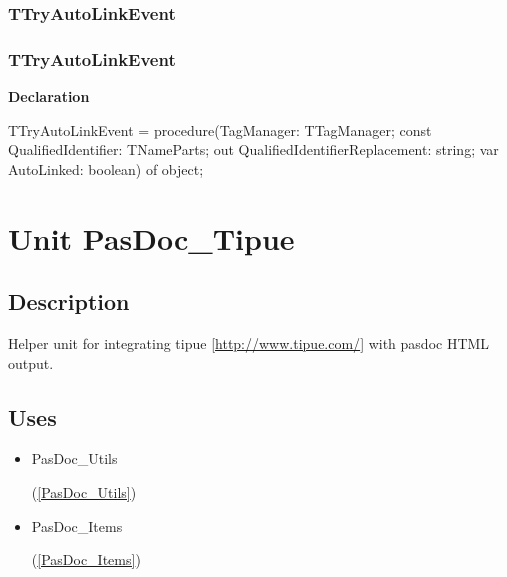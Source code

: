 \documentclass{report}
\newif\ifpdf
\begin{document}
\subsection*{\large{\textbf{TTryAutoLinkEvent}}\normalsize\hspace{1ex}\hrulefill}
\else
\subsection*{TTryAutoLinkEvent}
\fi
\label{PasDoc_TagManager-TTryAutoLinkEvent}
\begin{list}{}{
\setlength{\itemindent}{0cm}
\setlength{\listparindent}{0cm}
\setlength{\leftmargin}{\evensidemargin}
\addtolength{\leftmargin}{\tmplength}
\settowidth{\labelsep}{X}
\addtolength{\leftmargin}{\labelsep}
\setlength{\labelwidth}{\tmplength}
}
\item[\textbf{Declaration}\hfill]
\ifpdf
\begin{flushleft}
\fi
\begin{ttfamily}
TTryAutoLinkEvent = procedure(TagManager: TTagManager; const QualifiedIdentifier: TNameParts; out QualifiedIdentifierReplacement: string; var AutoLinked: boolean) of object;\end{ttfamily}

\ifpdf
\end{flushleft}
\fi

\end{list}
\chapter{Unit PasDoc{\_}Tipue}
\label{PasDoc_Tipue}
\section{Description}
Helper unit for integrating tipue [\href{http://www.tipue.com/}{http://www.tipue.com/}] with pasdoc HTML output.
\section{Uses}
\begin{itemize}
\item \begin{ttfamily}PasDoc{\_}Utils\end{ttfamily}(\ref{PasDoc_Utils})\item \begin{ttfamily}PasDoc{\_}Items\end{ttfamily}(\ref{PasDoc_Items})\end{itemize}
\end{document}
